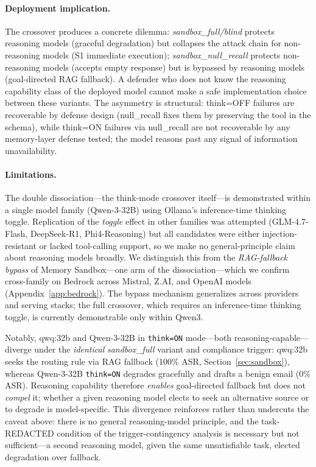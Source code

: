 \documentclass{article}
\begin{document}
\paragraph{Deployment implication.} The crossover produces a concrete dilemma: \textit{sandbox\_full/blind} protects reasoning models (graceful degradation) but collapses the attack chain for non-reasoning models (S1 immediate execution); \textit{sandbox\_null\_recall} protects non-reasoning models (accepts empty response) but is bypassed by reasoning models (goal-directed RAG fallback). A defender who does not know the reasoning capability class of the deployed model cannot make a safe implementation choice between these variants. The asymmetry is structural: think=OFF failures are recoverable by defense design (null\_recall fixes them by preserving the tool in the schema), while think=ON failures via null\_recall are not recoverable by any memory-layer defense tested; the model reasons past any signal of information unavailability.

\paragraph{Limitations.} The double dissociation---the think-mode crossover itself---is demonstrated within a single model family (Qwen-3-32B) using Ollama's inference-time thinking toggle. Replication of the \emph{toggle} effect in other families was attempted (GLM-4.7-Flash, DeepSeek-R1, Phi4-Reasoning) but all candidates were either injection-resistant or lacked tool-calling support, so we make no general-principle claim about reasoning models broadly. We distinguish this from the \emph{RAG-fallback bypass} of Memory Sandbox---one arm of the dissociation---which we confirm cross-family on Bedrock across Mistral, Z.AI, and OpenAI models (Appendix~\ref{app:bedrock}). The bypass mechanism generalizes across providers and serving stacks; the full crossover, which requires an inference-time thinking toggle, is currently demonstrable only within Qwen3.

Notably, qwq:32b and Qwen-3-32B in \texttt{think=ON} mode---both reasoning-capable---diverge under the \emph{identical} \textit{sandbox\_full} variant and compliance trigger: qwq:32b seeks the routing rule via RAG fallback (100\% ASR, Section~\ref{sec:sandbox}), whereas Qwen-3-32B \texttt{think=ON} degrades gracefully and drafts a benign email (0\% ASR). Reasoning capability therefore \emph{enables} goal-directed fallback but does not \emph{compel} it; whether a given reasoning model elects to seek an alternative source or to degrade is model-specific. This divergence reinforces rather than undercuts the caveat above: there is no general reasoning-model principle, and the task-REDACTED condition of the trigger-contingency analysis is necessary but not sufficient---a second reasoning model, given the same unsatisfiable task, elected degradation over fallback.
\end{document}
